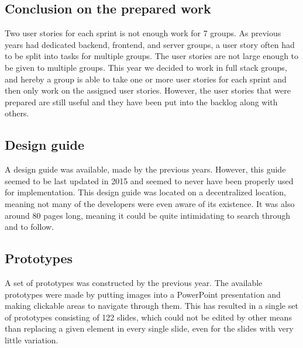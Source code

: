 \subsection{Conclusion on the prepared work}
Two user stories for each sprint is not enough work for 7 groups. 
As previous years had dedicated backend, frontend, and server groups, a user story often had to be split into tasks for multiple groups.
The user stories are not large enough to be given to multiple groups.
This year we decided to work in full stack groups, and hereby a group is able to take one or more user stories for each sprint and then only work on the assigned user stories.
However, the user stories that were prepared are still useful and they have been put into the backlog along with others.

\subsection{Design guide}
A design guide was available, made by the previous years.
However, this guide seemed to be last updated in 2015 and seemed to never have been properly used for implementation.
This design guide was located on a decentralized location, meaning not many of the developers were even aware of its existence.
It was also around 80 pages long, meaning it could be quite intimidating to search through and to follow.

\subsection{Prototypes}
A set of prototypes was constructed by the previous year.
The available prototypes were made by putting images into a PowerPoint presentation and making clickable areas to navigate through them.
This has resulted in a single set of prototypes consisting of 122 slides, which could not be edited by other means than replacing a given element in every single slide, even for the slides with very little variation.



